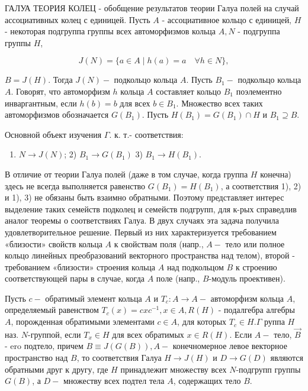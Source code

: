 \documentclass[10pt]{article}
\begin{document}
ГАЛУА ТЕОРИЯ КОЛЕЦ - обобщение результатов теории Галуа полей на случай ассоциативных колец с единицей. Пусть $A$ - ассоциативное кольцо с единицей, $H$ - некоторая подгруппа группы всех автоморфизмов кольца $A, N$ - подгруппа группы $H$,



\[

J(N)=\{a \in A \mid h(a)=a \quad \forall h \in N\},

\]



$B=J(H)$. Тогда $J(N)-$ подкольцо кольца $A$. Пусть $B_{1}-$ подкольцо кольца $A$. Говорят, что автоморфизм $h$ кольца $A$ составляет кольцо $B_{1}$ поэлементно инваргантным, если $h(b)=b$ для всех $b \in B_{1}$. Множество всех таких автоморфизмов обозначается $G\left(B_{1}\right)$. Пусть $H\left(B_{1}\right)=G\left(B_{1}\right) \cap H$ и $B_{1} \supseteq B$.



Основной объект изучения $\Gamma$. к. т.- соответствия:



\begin{enumerate}

  \item $N \rightarrow J(N)$; 2) $B_{1} \rightarrow G\left(B_{1}\right)$ 3) $B_{1} \rightarrow H\left(B_{1}\right)$.

\end{enumerate}



В отличие от теории Галуа полей (даже в том случае, когда группа $H$ конечна) здесь не всегда выполняется равенство $G\left(B_{1}\right)=H\left(B_{1}\right)$, а соответствия 1), 2) и 1), 3) не обязаны быть взаимно обратными. Поэтому представляет интерес выделение таких семейств подколец и семейств подгрупп, для к-рых справедлив аналог теоремы о соответствиях Галуа. В двух случаях эта задача получила удовлетворительное решение. Первый из них характеризуется требованием «близости» свойств кольца $A$ к свойствам поля (напр., $A-$ тело или полное кольцо линейных преобразований векторного пространства над телом), второй - требованием «близости» строения кольца $A$ над подкольцом $B$ к строению соответствующей пары в случае, когда $A$ поле (напр., $B$-модуль проективен).



Пусть $c-$ обратимый элемент кольца $A$ и $T_{c}: A \rightarrow A-$ автоморфизм кольца $A$, определяемый равенством $T_{c}(x)=c x c^{-1}, x \in A, R(H)$ - подалгебра алгебры $A$, порожденная обратимыми элементами $c \in A$, для которых $T_{c} \in H . \Gamma$ руппа $H$ наз. $N$-группой, если $T_{x} \in H$ для всех обратимых $x \in R(H)$. Если $A-$ тело, $\vec{B}$ - ero подтело, причем $B \equiv J(G(B)), A-$ конечномерное левое векторное пространство над $B$, то соответствия Галуа $H \rightarrow J(H)$ и $D \rightarrow G(D)$ являются обратными друг к другу, где $H$ принадлежит множеству всех $N$-подгрупп группы $G(B)$, а $D-$ множеству всех подтел тела $A$, содержащих тело $B$.
\end{document}
